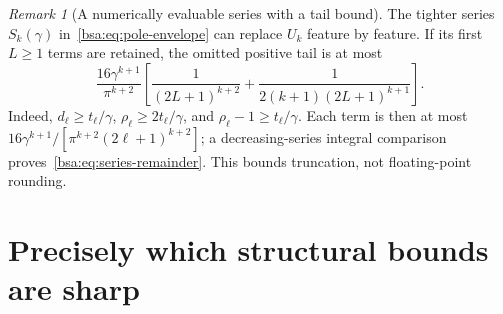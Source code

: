 \documentclass[11pt,letterpaper]{article}
\theoremstyle{remark}
\newtheorem{bsaRemark}{Remark}[section]
\theoremstyle{plain}
\begin{document}
\begin{bsaRemark}[A numerically evaluable series with a tail bound]
\label{bsa:rem:series-truncation}
The tighter series $S_k(\gamma)$ in~\eqref{bsa:eq:pole-envelope} can replace $U_k$ feature by feature. If its first $L\ge1$ terms are retained, the omitted positive tail is at most
\begin{equation}
 \frac{16\gamma^{k+1}}{\pi^{k+2}}
 \left[\frac1{(2L+1)^{k+2}}
 +\frac1{2(k+1)(2L+1)^{k+1}}\right].
 \label{bsa:eq:series-remainder}
\end{equation}
Indeed, $d_\ell\ge t_\ell/\gamma$, $\rho_\ell\ge2t_\ell/\gamma$, and
$\rho_\ell-1\ge t_\ell/\gamma$. Each term is then at most
$16\gamma^{k+1}/[\pi^{k+2}(2\ell+1)^{k+2}]$; a decreasing-series integral comparison proves~\eqref{bsa:eq:series-remainder}. This bounds truncation, not floating-point rounding.
\end{bsaRemark}

\section{Precisely which structural bounds are sharp}
\label{bsa:sec:sharpness}
\end{document}
